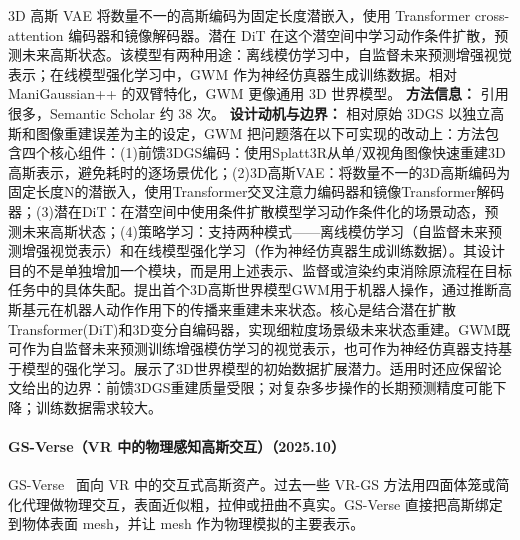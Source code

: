 3D 高斯 VAE 将数量不一的高斯编码为固定长度潜嵌入，使用 Transformer cross-attention 编码器和镜像解码器。潜在 DiT 在这个潜空间中学习动作条件扩散，预测未来高斯状态。该模型有两种用途：离线模仿学习中，自监督未来预测增强视觉表示；在线模型强化学习中，GWM 作为神经仿真器生成训练数据。相对 ManiGaussian++ 的双臂特化，GWM 更像通用 3D 世界模型。
\textbf{方法信息：} 引用很多，Semantic Scholar 约 38 次。
\textbf{设计动机与边界：} 相对原始 3DGS 以独立高斯和图像重建误差为主的设定，GWM 把问题落在以下可实现的改动上：方法包含四个核心组件：(1)前馈3DGS编码：使用Splatt3R从单/双视角图像快速重建3D高斯表示，避免耗时的逐场景优化；(2)3D高斯VAE：将数量不一的3D高斯编码为固定长度N的潜嵌入，使用Transformer交叉注意力编码器和镜像Transformer解码器；(3)潜在DiT：在潜空间中使用条件扩散模型学习动作条件化的场景动态，预测未来高斯状态；(4)策略学习：支持两种模式——离线模仿学习（自监督未来预测增强视觉表示）和在线模型强化学习（作为神经仿真器生成训练数据）。其设计目的不是单独增加一个模块，而是用上述表示、监督或渲染约束消除原流程在目标任务中的具体失配。提出首个3D高斯世界模型GWM用于机器人操作，通过推断高斯基元在机器人动作作用下的传播来重建未来状态。核心是结合潜在扩散Transformer(DiT)和3D变分自编码器，实现细粒度场景级未来状态重建。GWM既可作为自监督未来预测训练增强模仿学习的视觉表示，也可作为神经仿真器支持基于模型的强化学习。展示了3D世界模型的初始数据扩展潜力。适用时还应保留论文给出的边界：前馈3DGS重建质量受限；对复杂多步操作的长期预测精度可能下降；训练数据需求较大。
\paragraph{GS-Verse（VR 中的物理感知高斯交互）（2025.10）}
GS-Verse~\cite{2510_11878} 面向 VR 中的交互式高斯资产。过去一些 VR-GS 方法用四面体笼或简化代理做物理交互，表面近似粗，拉伸或扭曲不真实。GS-Verse 直接把高斯绑定到物体表面 mesh，并让 mesh 作为物理模拟的主要表示。

